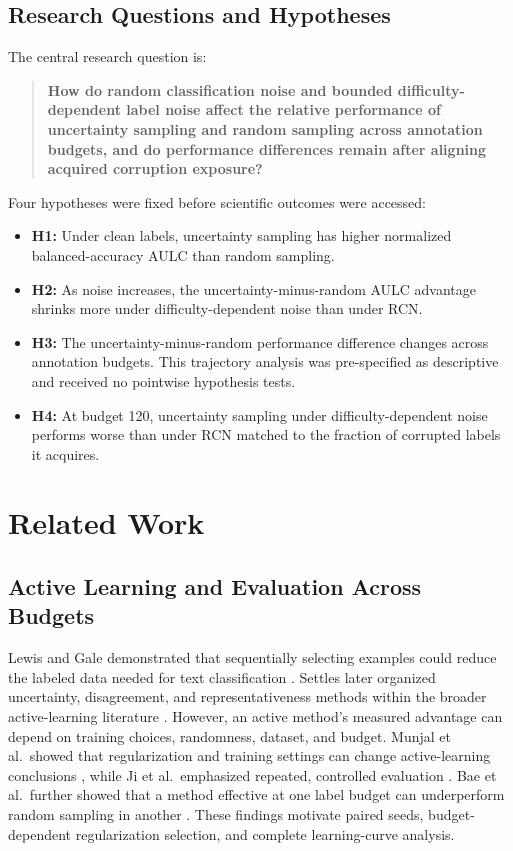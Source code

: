 \documentclass[11pt]{article}
\begin{document}
\subsection{Research Questions and Hypotheses}

The central research question is:

\begin{quote}
\textbf{How do random classification noise and bounded
difficulty-dependent label noise affect the relative performance of
uncertainty sampling and random sampling across annotation budgets, and do
performance differences remain after aligning acquired corruption exposure?}
\end{quote}

Four hypotheses were fixed before scientific outcomes were accessed:

\begin{itemize}
  \item \textbf{H1:} Under clean labels, uncertainty sampling has higher
  normalized balanced-accuracy AULC than random sampling.
  \item \textbf{H2:} As noise increases, the uncertainty-minus-random AULC
  advantage shrinks more under difficulty-dependent noise than under RCN.
  \item \textbf{H3:} The uncertainty-minus-random performance difference
  changes across annotation budgets. This trajectory analysis was
  pre-specified as descriptive and received no pointwise hypothesis tests.
  \item \textbf{H4:} At budget 120, uncertainty sampling under
  difficulty-dependent noise performs worse than under RCN matched to the
  fraction of corrupted labels it acquires.
\end{itemize}

\section{Related Work}

\subsection{Active Learning and Evaluation Across Budgets}

Lewis and Gale demonstrated that sequentially selecting examples could reduce
the labeled data needed for text classification \citep{lewis1994}. Settles
later organized uncertainty, disagreement, and representativeness methods
within the broader active-learning literature \citep{settles2009}. However,
an active method's measured advantage can depend on training choices,
randomness, dataset, and budget. Munjal et al.\ showed that regularization and
training settings can change active-learning conclusions \citep{munjal2022},
while Ji et al.\ emphasized repeated, controlled evaluation
\citep{ji2023}. Bae et al.\ further showed that a method effective at one
label budget can underperform random sampling in another \citep{bae2025}.
These findings motivate paired seeds, budget-dependent regularization
selection, and complete learning-curve analysis.
\end{document}
